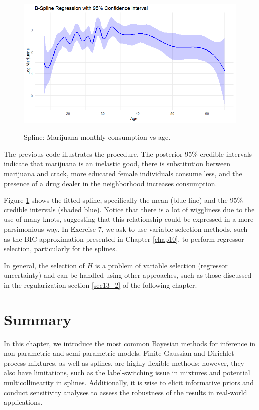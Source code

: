 \begin{figure}[!h]
	\includegraphics[width=340pt, height=200pt]{Chapters/chapter11/figures/AgeMarijuana.png}
	\caption[List of figure caption goes here]{Spline: Marijuana monthly consumption vs age.}\label{figAgeMarijuana}
\end{figure}

The previous code illustrates the procedure. The posterior 95\% credible intervals indicate that marijuana is an inelastic good, there is substitution between marijuana and crack, more educated female individuals consume less, and the presence of a drug dealer in the neighborhood increases consumption.

Figure \ref{figAgeMarijuana} shows the fitted spline, specifically the mean (blue line) and the 95\% credible intervals (shaded blue). Notice that there is a lot of wiggliness due to the use of many knots, suggesting that this relationship could be expressed in a more parsimonious way. In Exercise 7, we ask to use variable selection methods, such as the BIC approximation presented in Chapter \ref{chap10}, to perform regressor selection, particularly for the splines.

In general, the selection of $H$ is a problem of variable selection (regressor uncertainty) and can be handled using other approaches, such as those discussed in the regularization section \ref{sec13_2} of the following chapter.

\section{Summary}\label{sec11_3}

In this chapter, we introduce the most common Bayesian methods for inference in non-parametric and semi-parametric models. Finite Gaussian and Dirichlet process mixtures, as well as splines, are highly flexible methods; however, they also have limitations, such as the label-switching issue in mixtures and potential multicollinearity in splines. Additionally, it is wise to elicit informative priors and conduct sensitivity analyses to assess the robustness of the results in real-world applications.

